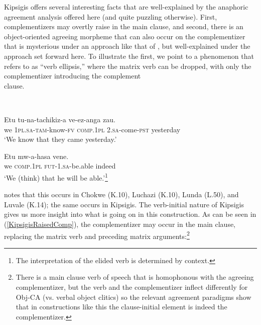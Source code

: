 \documentclass[output=paper
,modfonts
,nonflat
]{langsci/langscibook}
\begin{document}
Kipsigis offers several interesting facts that are well-explained by the anaphoric agreement analysis offered here (and quite puzzling otherwise). First, complementizers may overtly raise in the main clause, and second, there is an object-oriented agreeing morpheme that can also occur on the complementizer that is mysterious under an approach like that of \citet{Diercks:2013}, but well-explained under the approach set forward here. To illustrate the first, we point to a phenomenon that \citet{Kawasha:2007} refers to as ``verb ellipsis,'' where the matrix verb {\justifying can be dropped, with only the complementizer introducing the complement\\ clause.} 

\ea
{}\\
\begin{xlist}

\ex 
\gll Etu tu-na-tachikiz-a  ve-ez-anga zau. \\
we 1\textsc{pl}.\textsc{sa}-\textsc{tam}-know-\textsc{fv} \textsc{comp}.1\textsc{pl} 2.\textsc{sa}-come-\textsc{pst} yesterday \\
\glt `We know that they came yesterday.'

\ex 
\gll Etu  mw-a-hasa vene. \\  
we \textsc{comp}.1\textsc{pl} \textsc{fut}-1.\textsc{sa}-be.able indeed\\
\glt `We (think) that he will be able.'\footnote{The interpretation of the elided verb is determined by context.}

\end{xlist}
\z 

\noindent \citet{Kawasha:2007} notes that this occurs in Chokwe (K.10), Luchazi (K.10), Lunda (L.50), and Luvale (K.14); the same occurs in Kipsigis. The verb-initial nature of Kipsigis gives us more insight into what is going on in this construction. As can be seen in (\ref{KipsigisRaisedComp}), the complementizer may occur in the main clause, replacing the matrix verb and preceding matrix arguments:\footnote{There is a main clause verb of speech that is homophonous with the agreeing complementizer, but the verb and the complementizer inflect differently for Obj-CA (vs. verbal object clitics) so the relevant agreement paradigms show that in constructions like this the clause-initial element is indeed the complementizer.} 
\end{document}
